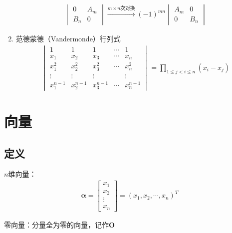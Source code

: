\documentclass[12pt]{book}
\begin{document}
\begin{enumerate}[1.]
\begin{gather*}
\begin{vmatrix}
            0 & A_m \\
            B_n & 0 
        \end{vmatrix}
        \xrightarrow[]{m\times n\text{次对换}} (-1)^{mn}
        \begin{vmatrix}
            A_m & 0 \\
            0 & B_n
        \end{vmatrix} 
    \end{gather*}
    \item 范德蒙德（Vandermonde）行列式
    \begin{gather*}
        \begin{vmatrix}
            1           & 1           & 1           & \cdots & 1           \\
            x_{1}       & x_{2}       & x_{3}       & \cdots & x_{n}       \\ 
            x_{1}^{2}   & x_{2}^{2}   & x_{3}^{2}   & \cdots & x_{n}^{2}   \\
            \vdots      & \vdots      & \vdots      &        & \vdots      \\
            x_{1}^{n-1} & x_{2}^{n-1} & x_{3}^{n-1} & \cdots & x_{n}^{n-1} 
        \end{vmatrix}
        = \prod_{1\leqslant j<i\leqslant n}{ (x_i - x_j) }
    \end{gather*}
\end{enumerate}












\section{向量}



\subsection{定义}

$n$维向量：
\begin{gather*}
    \bm{\alpha} = \begin{bmatrix}
        x_1 \\ x_2 \\ \vdots \\ x_n
    \end{bmatrix}
    = (x_1,x_2,\cdots,x_n)^T
\end{gather*}
\par 零向量：分量全为零的向量，记作$\bm{O}$
\end{document}
